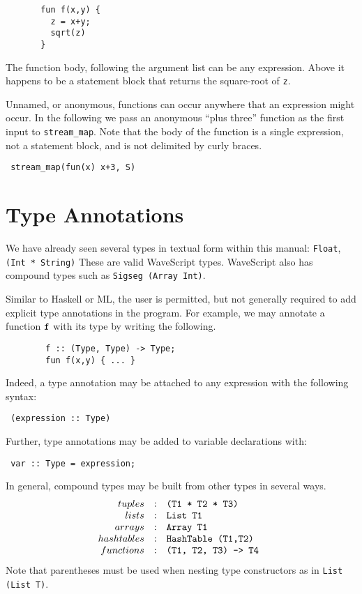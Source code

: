 \documentclass[twocolumn]{report}
\newenvironment{wscode}{\begin{center}\tt}{\end{center}}
\begin{document}
\begin{verbatim}
       fun f(x,y) {
         z = x+y;
         sqrt(z)
       }
\end{verbatim}

The function body, following the argument list can be any expression.
Above it happens to be a statement block that returns the
square-root of {\tt z}.

Unnamed, or anonymous, functions can occur anywhere that an expression
might occur. In the following we pass an anonymous ``plus three''
function as the first input to {\tt stream\_map}.  Note that the body
of the function is a single expression, not a statement block, and is
not delimited by curly braces.

\begin{wscode}
stream\_map(fun(x) x+3, S)
\end{wscode}




\section{Type Annotations}

We have already seen several types in textual form within this manual:
{\tt Float}, {\tt (Int * String)} These are valid WaveScript types.
WaveScript also has compound types such as {\tt Sigseg (Array Int)}.

Similar to Haskell or ML, the user is permitted, but not generally
required to add explicit type annotations in the program.  For
example, we may annotate a function {$\tt f$} with its type by writing
the following.
%
\begin{verbatim}
        f :: (Type, Type) -> Type;
        fun f(x,y) { ... }
\end{verbatim}

Indeed, a type annotation may be attached to any expression with
the following syntax:
\begin{wscode}
(expression :: Type)
\end{wscode}

Further, type annotations may be added to variable declarations with:
\begin{wscode}
 var :: Type = expression;
\end{wscode}

In general, compound types may be built from other types in several
ways.  
\[
\begin{array}{rcl}
tuples           & : & $\tt (T1 * T2 * T3) $   \\
lists            & : & $\tt List T1 $ \\
arrays           & : & $\tt Array T1 $ \\
hashtables       & : & $\tt HashTable (T1,T2) $ \\
functions        & : & $\tt (T1, T2, T3) -> T4 $ \\
\end{array}
\]
Note that parentheses must be used when nesting type
constructors as in {\tt List (List T)}.
\end{document}

